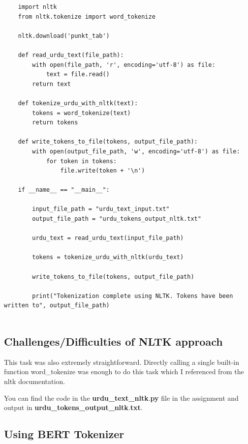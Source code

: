 \documentclass[a4paper,12pt]{article}
\begin{document}
\begin{lstlisting}
    import nltk
    from nltk.tokenize import word_tokenize
    
    nltk.download('punkt_tab')
    
    def read_urdu_text(file_path):
        with open(file_path, 'r', encoding='utf-8') as file:
            text = file.read()
        return text
    
    def tokenize_urdu_with_nltk(text):
        tokens = word_tokenize(text)
        return tokens
    
    def write_tokens_to_file(tokens, output_file_path):
        with open(output_file_path, 'w', encoding='utf-8') as file:
            for token in tokens:
                file.write(token + '\n')
    
    if __name__ == "__main__":
        
        input_file_path = "urdu_text_input.txt"
        output_file_path = "urdu_tokens_output_nltk.txt"
        
        urdu_text = read_urdu_text(input_file_path)
    
        tokens = tokenize_urdu_with_nltk(urdu_text)
    
        write_tokens_to_file(tokens, output_file_path)
    
        print("Tokenization complete using NLTK. Tokens have been written to", output_file_path)
    
\end{lstlisting}

\subsection{Challenges/Difficulties of NLTK approach}

This task was also extremely straightforward. Directly calling a single built-in function word\_tokenize was enough to do this task which I referenced from the nltk documentation.

You can find the code in the \textbf{urdu\_text\_nltk$.$py} file in the assignment and output in \textbf{urdu\_tokens\_output\_nltk$.$txt}.

\subsection{Using BERT Tokenizer}
\end{document}
